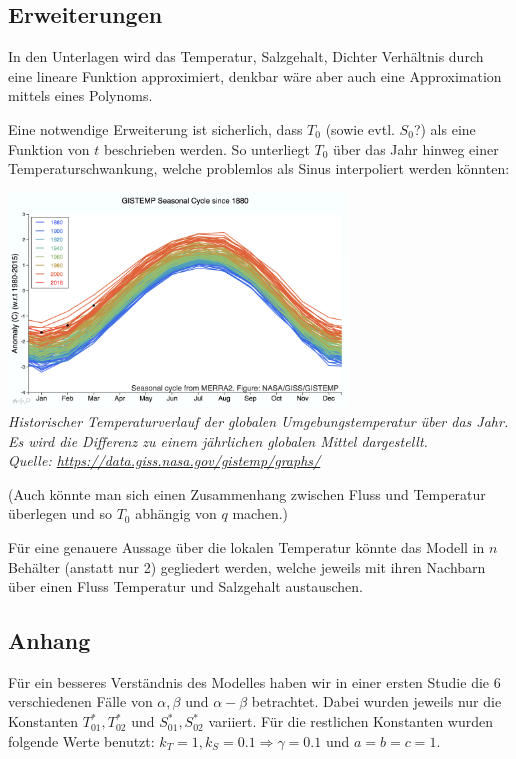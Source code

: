 \documentclass[10pt,a4paper]{article}
\begin{document}
	\newpage
	\subsection*{Erweiterungen}
	
	In den Unterlagen wird das Temperatur, Salzgehalt, Dichter Verhältnis durch eine lineare Funktion approximiert, denkbar wäre aber auch eine Approximation mittels eines Polynoms.
	
	Eine notwendige Erweiterung ist sicherlich, dass \(T_0\) (sowie evtl. \(S_0\)?) als eine Funktion von \(t\) beschrieben werden. So unterliegt \(T_0\) über das Jahr hinweg einer Temperaturschwankung, welche problemlos als Sinus interpoliert werden könnten:
	
	\begin{center}
	\includegraphics[width=9cm]{Grafik/GISTEMP.png} \\
	\textit{Historischer Temperaturverlauf der globalen Umgebungstemperatur über das Jahr. Es wird die Differenz zu einem jährlichen globalen Mittel dargestellt.  \\
	Quelle: \url{https://data.giss.nasa.gov/gistemp/graphs/}}
	\end{center}	
	
	(Auch könnte man sich einen Zusammenhang zwischen Fluss und Temperatur überlegen und so \(T_0\) abhängig von \(q\) machen.)
	
	Für eine genauere Aussage über die lokalen Temperatur könnte das Modell in \(n\) Behälter (anstatt nur 2) gegliedert werden, welche jeweils mit ihren Nachbarn über einen Fluss Temperatur und Salzgehalt austauschen.
	
	\newpage
	\subsection*{Anhang}
	
	Für ein besseres Verständnis des Modelles haben wir in einer ersten Studie die 6 verschiedenen Fälle von \(\alpha, \beta \) und \(\alpha - \beta\) betrachtet. Dabei wurden jeweils nur die Konstanten \(T^*_{01}, T^*_{02}\) und \(S^*_{01}, S^*_{02}\) variiert. Für die restlichen Konstanten wurden folgende Werte benutzt: \(k_T = 1, k_S = 0.1 \Rightarrow \gamma = 0.1\) und \(a = b = c = 1 \). 
	
\end{document}

